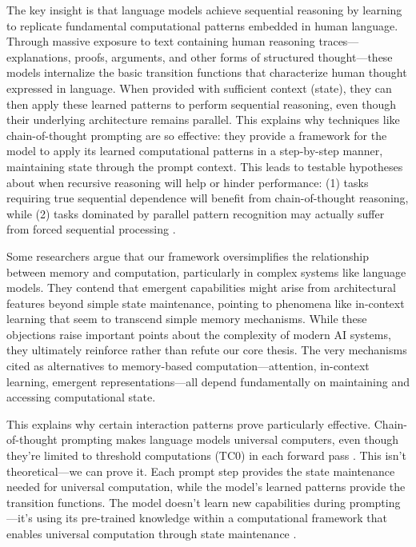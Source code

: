 \documentclass[12pt]{article}
\begin{document}
The key insight is that language models achieve sequential reasoning by learning to replicate fundamental computational patterns embedded in human language.
Through massive exposure to text containing human reasoning traces---explanations, proofs, arguments, and other forms of structured thought---these models internalize the basic transition functions that characterize human thought expressed in language.
When provided with sufficient context (state), they can then apply these learned patterns to perform sequential reasoning, even though their underlying architecture remains parallel.
This explains why techniques like chain-of-thought prompting are so effective: they provide a framework for the model to apply its learned computational patterns in a step-by-step manner, maintaining state through the prompt context.
This leads to testable hypotheses about when recursive reasoning will help or hinder performance: (1) tasks requiring true sequential dependence will benefit from chain-of-thought reasoning, while (2) tasks dominated by parallel pattern recognition may actually suffer from forced sequential processing \cite{liu2024mind}.

Some researchers argue that our framework oversimplifies the relationship between memory and computation, particularly in complex systems like language models. They contend that emergent capabilities might arise from architectural features beyond simple state maintenance, pointing to phenomena like in-context learning that seem to transcend simple memory mechanisms. While these objections raise important points about the complexity of modern AI systems, they ultimately reinforce rather than refute our core thesis. The very mechanisms cited as alternatives to memory-based computation---attention, in-context learning, emergent representations---all depend fundamentally on maintaining and accessing computational state.

This explains why certain interaction patterns prove particularly effective.
Chain-of-thought prompting makes language models universal computers, even though they're limited to threshold computations (TC0) in each forward pass \cite{wei2022chain}.
This isn't theoretical---we can prove it.
Each prompt step provides the state maintenance needed for universal computation, while the model's learned patterns provide the transition functions.
The model doesn't learn new capabilities during prompting---it's using its pre-trained knowledge within a computational framework that enables universal computation through state maintenance \cite{ahn2024recursive}.
\end{document}
